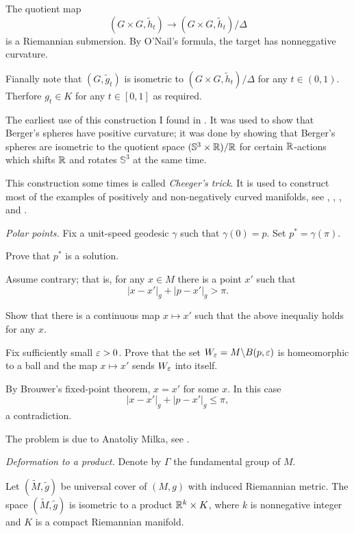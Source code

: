 The quotient map 
\[
 (G\times G,\tilde h_t)\to (G\times G,\tilde h_t)/\Delta
\]
is a Riemannian submersion.
By O'Nail's formula,
the target has nonneggative curvature.

Fianally note that $(G,\tilde g_t)$
is isometric to
$(G\times G,\tilde h_t)/\Delta$ for any $t\in (0,1)$.
Therfore $g_t\in K$ for any $t\in [0,1]$ as required.

The earliest use of this construction 
I found  in \cite{GKM}.
It was used to show that Berger's spheres have positive curvature;
it was done by showing that
Berger's spheres are isometric to the quotient space $(\mathbb S^3\times \mathbb{R})/\mathbb{R}$ for certain $\mathbb{R}$-actions which shifts $\mathbb{R}$ and rotates $\mathbb{S}^3$ at the same time.

This construction some times is called \emph{Cheeger's trick}.
It is used to construct most of the examples of positively and non-negatively curved manifolds,
see \cite{cheeger}, \cite{aloff-wallach}, \cite{gromoll-meyer}, \cite{eschenburg-spaces} and \cite{bazajkin}.





\textit{Polar points.}
Fix a unit-speed geodesic $\gamma$ such that $\gamma(0)=p$.
Set $p^*=\gamma(\pi)$.

Prove that $p^*$ is a solution.

Assume contrary;
that is, for any $x\in M$ there is a point $x'$ such that 
\[|x-x'|_g+|p-x'|_g>\pi.\]

Show that there is a continuous map $x\mapsto x'$
such that the above inequaliy holds for any $x$.

Fix sufficiently small $\varepsilon>0$.
Prove that the set $W_\varepsilon=M\backslash B(p,\varepsilon)$ 
is homeomorphic to a ball 
and the map $x\mapsto x'$ sends $W_\varepsilon$ into itself.

By Brouwer's fixed-point theorem, $x=x'$ for some $x$.
In this case 
\[|x-x'|_g+|p-x'|_g\le \pi,\]
a contradiction.
 
The problem is due to Anatoliy Milka, see \cite{milka-poly}.

\textit{Deformation to a product.} 
Denote by $\Gamma$ the fundamental group of $M$.

Let $(\tilde M,\tilde g)$ be universal cover of $(M,g)$ with induced Riemannian metric.
The space $(\tilde M,\tilde g)$ is isometric to a product $\mathbb{R}^k\times K$, 
where $k$ is nonnegative integer and $K$ is a compact Riemannian manifold.

